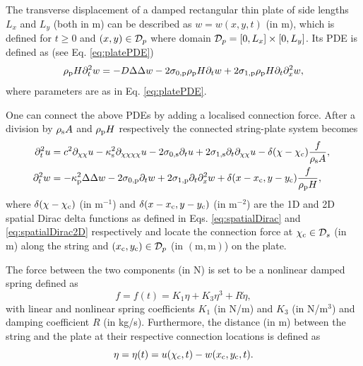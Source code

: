 The transverse displacement of a damped rectangular thin plate of side lengths $L_x$ and $L_y$ (both in m) can be described as $w=w(x,y,t)$ (in m), which is defined for $t\geq 0$ and $(x,y)\in \mathcal{D}_p$ where domain $\mathcal{D}_p = [0, L_x] \times [0, L_y]$. Its PDE is defined as (see Eq. \eqref{eq:platePDE})
\begin{equation}
    \rho_\ptxt H\ptt w = -D\Delta\Delta w - 2\szX[\ptxt]\rho_\ptxt H\pt w + 2\soX[\ptxt] \rho_\ptxt H\pt\pxx w,
\end{equation}
where parameters are as in Eq. \eqref{eq:platePDE}.

One can connect the above PDEs by adding a localised connection force. After a division by $\rho_{\text{s}} A$ and $\rho_{\text{p}} H$ respectively the connected string-plate system becomes
\begin{subequations}\label{eq:connStringPlatePDEs}
    \begin{align}
        \!\!\ptt u &= c^2 \partial_{\chi\chi} u - \kappa_\stxt^2 \partial_{\chi\chi\chi\chi} u - 2\szX[\stxt]\pt u + 2\soX[\stxt] \pt\partial_{\chi\chi} u - \delta(\chi-\chi_\ctxt)\frac{f}{\rho_\stxt A},\\
    \!\!\ptt w &= -\kappa_\ptxt^2\Delta\Delta w - 2\szX[\ptxt]\pt w + 2\soX[\ptxt] \pt\pxx w + \delta(x-x_\ctxt, y-y_\ctxt)\frac{f}{ \rho_\ptxt H},
    \end{align}
\end{subequations}
where $\delta(\chi-\chi_{\text{c}})$ (in m$^{-1}$) and $\delta(x-x_{\text{c}}, y-y_{\text{c}})$ (in m$^{-2}$) are the 1D and 2D spatial Dirac delta functions as defined in Eqs. \eqref{eq:spatialDirac} and \eqref{eq:spatialDirac2D} respectively and locate the connection force at $\chi_{\text{c}} \in \mathcal{D}_s$ (in m) along the string and $(x_{\text{c}},y_{\text{c}})\in \mathcal{D}_p$ (in $(\text{m}, \text{m})$) on the plate.

The force between the two components (in N) is set to be a nonlinear damped spring defined as
\begin{equation}\label{eq:nonlinearForce}
    f = f(t) = K_1\eta+K_3\eta^3+R \dot\eta,
\end{equation}
with linear and nonlinear spring coefficients $K_1$ (in N/m) and $K_3$ (in N/m$^3$) and damping coefficient $R$ (in kg/s). Furthermore, the distance (in m) between the string and the plate at their respective connection locations is defined as
\begin{equation}
    \eta = \eta(t) = u(\chi_{\text{c}}, t) - w(x_{\text{c}}, y_{\text{c}}, t).
\end{equation}


